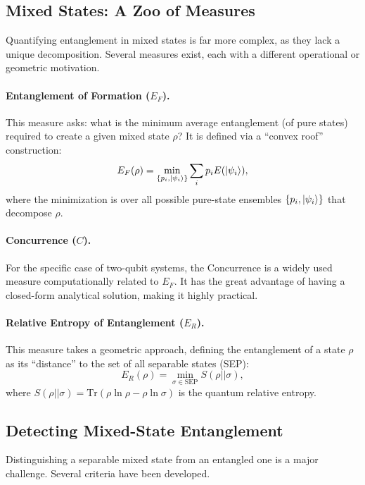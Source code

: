 \subsection{Mixed States: A Zoo of Measures}
\label{sub:mixed_state_measures}
Quantifying entanglement in mixed states is far more complex, as they lack
a unique decomposition. Several measures exist, each with a different
operational or geometric motivation.

\paragraph{Entanglement of Formation (\texorpdfstring{$E_F$}{E\_F}).}
This measure asks: what is the minimum average entanglement (of pure states)
required to create a given mixed state $\rho$? It is defined via a
``convex roof'' construction:
\begin{equation}
	E_F(\rho) = \min_{\{p_i, \ket{\psi_i}\}} \sum_i p_i E(\ket{\psi_i}),
\end{equation}
where the minimization is over all possible pure-state ensembles
$\{p_i, \ket{\psi_i}\}$ that decompose $\rho$.

\paragraph{Concurrence (\texorpdfstring{$C$}{C}).}
For the specific case of two-qubit systems, the Concurrence is a widely
used measure computationally related to $E_F$. It has the great advantage
of having a closed-form analytical solution, making it highly practical.

\paragraph{Relative Entropy of Entanglement (\texorpdfstring{$E_R$}{E\_R}).}
This measure takes a geometric approach, defining the entanglement of a
state $\rho$ as its ``distance'' to the set of all separable states (SEP):
\begin{equation}
	E_R(\rho) = \min_{\sigma \in \text{SEP}} S(\rho || \sigma),
\end{equation}
where $S(\rho || \sigma) = \mathrm{Tr}(\rho \ln \rho - \rho \ln \sigma)$ is
the quantum relative entropy.

\subsection{Detecting Mixed-State Entanglement}
\label{sub:detecting_entanglement}
Distinguishing a separable mixed state from an entangled one is a major
challenge. Several criteria have been developed.

